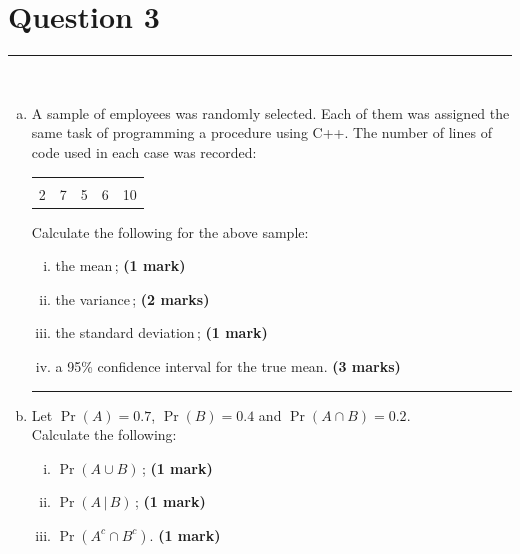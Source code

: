 \documentclass[12pt]{article}
\begin{document}
\newpage



\section*{Question 3 }
\noindent\rule{\linewidth}{1pt}
\quad\\[-0.5cm]
\begin{enumerate}[a)]
\item A sample of employees was randomly selected. Each of them was assigned the same task of programming a procedure using C++. The number of lines of code used in each case was recorded:
\begin{center}
\begin{tabular}{|ccccc|}
\hline
&&&&\\[-0.4cm]
2 & 7 & 5 & 6 & 10 \\
\hline
\end{tabular}
\end{center}
Calculate the following for the above sample:
    \begin{enumerate}[i)]\itemsep0.3cm
    \item the mean\,; \hfill{\scriptsize \bf (1 mark)}
    \item the variance\,; \hfill{\scriptsize \bf (2 marks)}
    \item the standard deviation\,; \hfill{\scriptsize \bf (1 mark)}
    \item a 95\% confidence interval for the true mean. \hfill{\scriptsize \bf (3 marks)}
    \end{enumerate}
\begin{center}\noindent\rule{0.4\linewidth}{0.5pt}\end{center}
\item Let $\Pr(A) = 0.7$, $\Pr(B)=0.4$ and $\Pr(A\cap B) = 0.2$.\\[0.2cm]
    Calculate the following:
    \begin{enumerate}[i)]\itemsep0.3cm
    \item $\Pr(A\cup B)$\,; \hfill{\scriptsize \bf (1 mark)}
    \item $\Pr(A\,|\,B)$\,; \hfill{\scriptsize \bf (1 mark)}
    \item $\Pr(A^c \cap B^c)$. \hfill{\scriptsize \bf (1 mark)}

\end{enumerate}
\end{enumerate}
\end{document}
